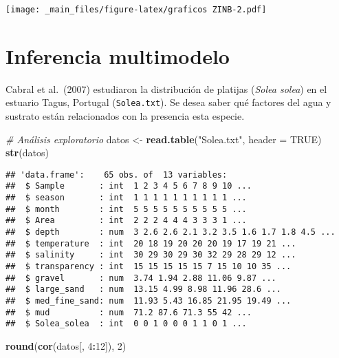 \documentclass[
]{book}
\newenvironment{Shaded}{\begin{snugshade}}{\end{snugshade}}
\newcommand{\CommentTok}[1]{\textcolor[rgb]{0.56,0.35,0.01}{\textit{#1}}}
\newcommand{\DataTypeTok}[1]{\textcolor[rgb]{0.13,0.29,0.53}{#1}}
\newcommand{\DecValTok}[1]{\textcolor[rgb]{0.00,0.00,0.81}{#1}}
\newcommand{\KeywordTok}[1]{\textcolor[rgb]{0.13,0.29,0.53}{\textbf{#1}}}
\newcommand{\NormalTok}[1]{#1}
\newcommand{\OperatorTok}[1]{\textcolor[rgb]{0.81,0.36,0.00}{\textbf{#1}}}
\newcommand{\OtherTok}[1]{\textcolor[rgb]{0.56,0.35,0.01}{#1}}
\newcommand{\StringTok}[1]{\textcolor[rgb]{0.31,0.60,0.02}{#1}}
\begin{document}
\texttt{[image: \_main\_files/figure-latex/graficos ZINB-2.pdf]}

\hypertarget{inferencia-multimodelo}{%
\section{Inferencia multimodelo}\label{inferencia-multimodelo}}

Cabral et al.~(2007) estudiaron la distribución de platijas (\emph{Solea solea}) en el estuario Tagus, Portugal (\texttt{Solea.txt}). Se desea saber qué factores del agua y sustrato están relacionados con la presencia esta especie.

\begin{Shaded}
\begin{Highlighting}[]
\CommentTok{# Análisis exploratorio}
\NormalTok{datos <-}\StringTok{ }\KeywordTok{read.table}\NormalTok{(}\StringTok{"Solea.txt"}\NormalTok{, }\DataTypeTok{header =} \OtherTok{TRUE}\NormalTok{)}
\KeywordTok{str}\NormalTok{(datos)}
\end{Highlighting}
\end{Shaded}

\begin{verbatim}
## 'data.frame':    65 obs. of  13 variables:
##  $ Sample       : int  1 2 3 4 5 6 7 8 9 10 ...
##  $ season       : int  1 1 1 1 1 1 1 1 1 1 ...
##  $ month        : int  5 5 5 5 5 5 5 5 5 5 ...
##  $ Area         : int  2 2 2 4 4 4 3 3 3 1 ...
##  $ depth        : num  3 2.6 2.6 2.1 3.2 3.5 1.6 1.7 1.8 4.5 ...
##  $ temperature  : int  20 18 19 20 20 20 19 17 19 21 ...
##  $ salinity     : int  30 29 30 29 30 32 29 28 29 12 ...
##  $ transparency : int  15 15 15 15 15 7 15 10 10 35 ...
##  $ gravel       : num  3.74 1.94 2.88 11.06 9.87 ...
##  $ large_sand   : num  13.15 4.99 8.98 11.96 28.6 ...
##  $ med_fine_sand: num  11.93 5.43 16.85 21.95 19.49 ...
##  $ mud          : num  71.2 87.6 71.3 55 42 ...
##  $ Solea_solea  : int  0 0 1 0 0 0 1 1 0 1 ...
\end{verbatim}

\begin{Shaded}
\begin{Highlighting}[]
\KeywordTok{round}\NormalTok{(}\KeywordTok{cor}\NormalTok{(datos[, }\DecValTok{4}\OperatorTok{:}\DecValTok{12}\NormalTok{]), }\DecValTok{2}\NormalTok{)}
\end{Highlighting}
\end{Shaded}
\end{document}

